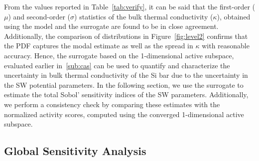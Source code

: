 %
From the values reported in Table~\ref{tab:verify}, it can be said that the
 first-order ($\mu$) and second-order ($\sigma$) statistics of the bulk thermal conductivity ($\kappa$),
obtained using the model and the surrogate  are found to be in close agreement. Additionally, the
comparison of distributions in Figure~\ref{fig:level2} confirms that the PDF captures the modal
estimate as well as the spread in $\kappa$ with reasonable accuracy. Hence, the surrogate based on
the 1-dimensional active subspace, evaluated earlier in~\ref{sub:cas} can be used to quantify and
characterize the uncertainty in bulk thermal conductivity of the Si bar due to the uncertainty in the
SW potential parameters. In the following section, we use the surrogate to estimate the total Sobol'
sensitivity indices of the SW parameters. Additionally, we perform a consistency check by comparing
these estimates with the normalized activity scores, computed using the converged 1-dimensional
active subspace. 

\subsection{Global Sensitivity Analysis}
\label{sub:gsa}

